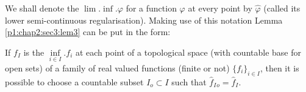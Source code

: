 \begin{remark*}
  We shall denote the $\lim. \inf. \varphi$ for a function $\varphi$
  at every point by $\hat{\varphi}$ (called its lower semi-continuous
  regularisation). Making use of this notation Lemma
  \ref{p1:chap2:sec3:lem3} can be put in the form: 
\end{remark*}

If $f_I$ is the $\inf \limits_{i \in I}. f_i$ at each point of a
topological space (with countable base for open sets) of a family of
real valued functions (finite or not) $\{ f_i \}_{i \in I}$, then it
is possible to choose a countable subset $I_o \subset I$ such that
$\hat{f}_I{_o}= \hat{f}_I$.  
